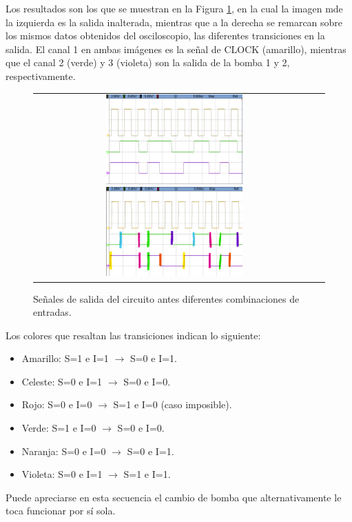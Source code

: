 Los resultados son los que se muestran en la Figura \ref{fig:fsm_testing}, en la cual la imagen mde la izquierda es la salida inalterada, mientras que a la derecha se 
remarcan sobre los mismos datos obtenidos del osciloscopio, las diferentes transiciones en la salida.
El canal 1 en ambas imágenes es la señal de CLOCK (amarillo), mientras que el canal 2 (verde) y 3 (violeta) son la salida de la bomba 1 y 2, respectivamente.
\begin{figure}[H]
    \centering
    \begin{tabular} {c c}
        \includegraphics[width=0.5\textwidth]{../EJ1/Recursos/fsm_testing.png}
        \includegraphics[width=0.5\textwidth]{../EJ1/Recursos/fsm_testing_sketched.png}
    \end{tabular}
    \caption{Señales de salida del circuito antes diferentes combinaciones de entradas.}
    \label{fig:fsm_testing}
\end{figure}
Los colores que resaltan las transiciones indican lo siguiente:
\begin{itemize}
    \item Amarillo: S=1 e I=1 $\rightarrow$ S=0 e I=1.
    \item Celeste: S=0 e I=1 $\rightarrow$ S=0 e I=0.
    \item Rojo: S=0 e I=0 $\rightarrow$ S=1 e I=0 (caso imposible).
    \item Verde: S=1 e I=0 $\rightarrow$ S=0 e I=0.
    \item Naranja: S=0 e I=0 $\rightarrow$ S=0 e I=1.
    \item Violeta: S=0 e I=1 $\rightarrow$ S=1 e I=1.
\end{itemize}
Puede apreciarse en esta secuencia el cambio de bomba que alternativamente le toca funcionar por sí sola.




